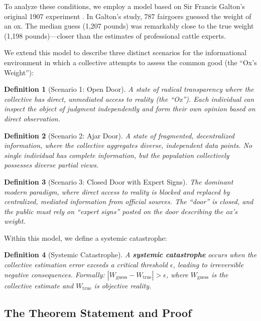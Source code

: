 \documentclass[11pt,a4paper]{article}
\newtheorem{definition}{Definition}[section]
\begin{document}
\begin{small}
To analyze these conditions, we employ a model based on Sir Francis Galton's original 1907 experiment \citep{Galton1907}. In Galton's study, 787 fairgoers guessed the weight of an ox. The median guess (1,207 pounds) was remarkably close to the true weight (1,198 pounds)---closer than the estimates of professional cattle experts.

We extend this model to describe three distinct scenarios for the informational environment in which a collective attempts to assess the common good (the ``Ox's Weight''):

\begin{definition}[Scenario 1: Open Door]
A state of radical transparency where the collective has direct, unmediated access to reality (the ``Ox''). Each individual can inspect the object of judgment independently and form their own opinion based on direct observation.
\end{definition}

\begin{definition}[Scenario 2: Ajar Door]
A state of fragmented, decentralized information, where the collective aggregates diverse, independent data points. No single individual has complete information, but the population collectively possesses diverse partial views.
\end{definition}

\begin{definition}[Scenario 3: Closed Door with Expert Signs]
The dominant modern paradigm, where direct access to reality is blocked and replaced by centralized, mediated information from official sources. The ``door'' is closed, and the public must rely on ``expert signs'' posted on the door describing the ox's weight.
\end{definition}

Within this model, we define a systemic catastrophe:

\begin{definition}[Systemic Catastrophe]
A \textbf{systemic catastrophe} occurs when the collective estimation error exceeds a critical threshold $\epsilon$, leading to irreversible negative consequences. Formally: $|W_{\text{guess}} - W_{\text{true}}| > \epsilon$, where $W_{\text{guess}}$ is the collective estimate and $W_{\text{true}}$ is objective reality.
\end{definition}

\subsection{The Theorem Statement and Proof}


\end{small}
\end{document}
